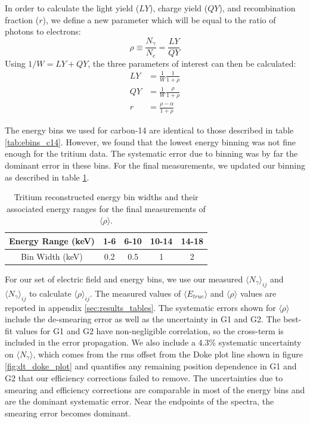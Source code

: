 In order to calculate the light yield ($LY$), charge yield ($QY$), and recombination fraction ($r$), we define a new parameter which will be equal to the ratio of photons to electrons:
\begin{equation}
\rho \equiv \frac{N_{\gamma}}{N_e}=\frac{LY}{QY}
\end{equation}
Using $1/W=LY+QY$, the three parameters of interest can then be calculated:
\begin{equation}\label{eq:translate_rho}
\begin{split}
LY&=\frac{1}{W}\frac{1}{1+\rho}\\[1em]
QY&=\frac{1}{W}\frac{\rho}{1+\rho}\\[1em]
r&=\frac{\rho-\alpha}{1+\rho}
\end{split}
\end{equation}

The energy bins we used for carbon-14 are identical to those described in table \ref{tab:ebins_c14}. However, we found that the lowest energy binning was not fine enough for the tritium data. The systematic error due to binning was by far the dominant error in these bins. For the final measurements, we updated our binning as described in table \ref{tab:ebins_h3_new}.
\begin{table}[h!]
\centering
    \begin{tabular}{ c || c | c | c | c  }
    \hline
    Energy Range (keV) & 1-6  & 6-10 & 10-14 & 14-18\\
    \hline
    Bin Width (keV)         &  0.2      &  0.5         & 1           & 2 \\
    \hline
    \end{tabular}
    \caption{Tritium reconstructed energy bin widths and their associated energy ranges for the final measurements of $\langle \rho \rangle$.}
    \label{tab:ebins_h3_new}
\end{table}

For our set of electric field and energy bins, we use our measured $\langle N_{\gamma} \rangle_{ij}$ and $\langle N_{\gamma} \rangle_{ij}$ to calculate $\langle \rho \rangle_{ij}$. The measured values of $\langle E_{true} \rangle$ and $\langle \rho \rangle$ values are reported in appendix \ref{sec:results_tables}. The systematic errors shown for $\langle \rho \rangle$ include the de-smearing error as well as the uncertainty in G1 and G2. The best-fit values for G1 and G2 have non-negligible correlation, so the cross-term is included in the error propagation. We also include a 4.3\% systematic uncertainty on $\langle N_{\gamma} \rangle$, which comes from the rms offset from the Doke plot line shown in figure \ref{fig:dt_doke_plot} and quantifies any remaining position dependence in G1 and G2 that our efficiency corrections failed to remove. The uncertainties due to smearing and efficiency corrections are comparable in most of the energy bins and are the dominant systematic error. Near the endpoints of the spectra, the smearing error becomes dominant.

